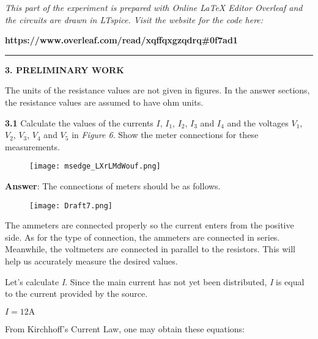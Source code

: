 \documentclass{article}
\begin{document}
{\large \textit{This part of the experiment is prepared with Online LaTeX Editor Overleaf and the circuits are drawn in LTspice. Visit the website for the code here:}}

{\large \textbf{https://www.overleaf.com/read/xqffqxgzqdrq\#0f7ad1}}
\vspace{4mm}
\hrule
\vspace{4mm}
{\textbf{\Large 3. PRELIMINARY WORK}}

\vspace{4mm}

{\Large The units of the resistance values are not given in figures. In the answer sections, the resistance values are assumed to have ohm units.}

\vspace{4mm}

{\Large \textbf{3.1} Calculate the values of the currents $I$, $I_{1}$, $I_{2}$, $I_{3}$ and $I_{4}$ and the voltages $V_{1}$, $V_{2}$, $V_{3}$, $V_{4}$ and $V_{5}$ in \textit{Figure 6}. Show the meter connections for these measurements.}

\begin{figure}[H]
    \centering
    \texttt{[image: msedge\_LXrLMdWouf.png]}
\end{figure}

{\Large \textbf{Answer}: The connections of meters should be as follows.}

\begin{figure}[H]
    \centering
    \texttt{[image: Draft7.png]}
\end{figure}

\vspace{4mm}

{\Large The ammeters are connected properly so the current enters from the positive side. As for the type of connection, the ammeters are connected in series. Meanwhile, the voltmeters are connected in parallel to the resistors. This will help us accurately measure the desired values.}

{\Large  Let's calculate \textit{I}. Since the main current has not yet been distributed, \textit{I} is equal to the current provided by the source.}

\vspace{4mm}

{\Large $\boxed{I = 12 \text{A}}$}

\vspace{4mm}

{\Large From Kirchhoff's Current Law, one may obtain these equations:}
\end{document}
